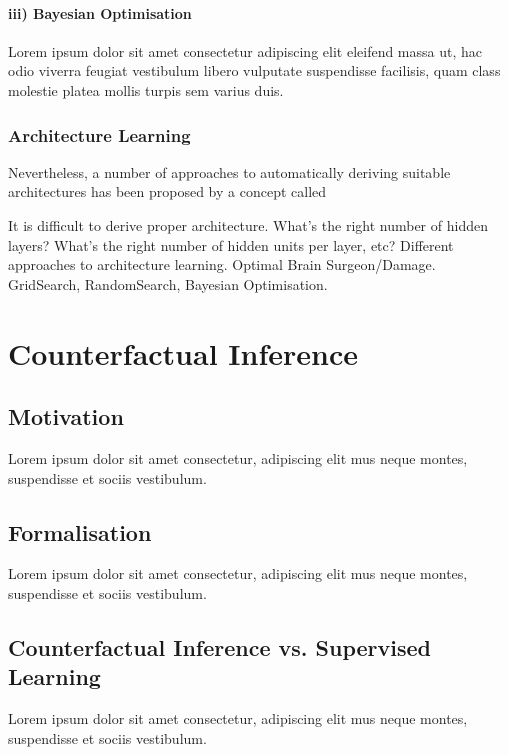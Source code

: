 \paragraph{iii) Bayesian Optimisation} Lorem ipsum dolor sit amet consectetur adipiscing elit eleifend massa ut, hac odio viverra feugiat vestibulum libero vulputate suspendisse facilisis, quam class molestie platea mollis turpis sem varius duis.


\subsubsection{Architecture Learning}
Nevertheless, a number of approaches to automatically deriving suitable architectures has been proposed by a concept called 

It is difficult to derive proper architecture. 
What's the right number of hidden layers? What's the right number of hidden units per layer, etc? 
Different approaches to architecture learning. Optimal Brain Surgeon/Damage. GridSearch, RandomSearch, Bayesian Optimisation.

%


\section{Counterfactual Inference}
\subsection{Motivation}
Lorem ipsum dolor sit amet consectetur, adipiscing elit mus neque montes, suspendisse et sociis vestibulum.

\subsection{Formalisation}
Lorem ipsum dolor sit amet consectetur, adipiscing elit mus neque montes, suspendisse et sociis vestibulum.

\subsection{Counterfactual Inference vs. Supervised Learning}
Lorem ipsum dolor sit amet consectetur, adipiscing elit mus neque montes, suspendisse et sociis vestibulum.

